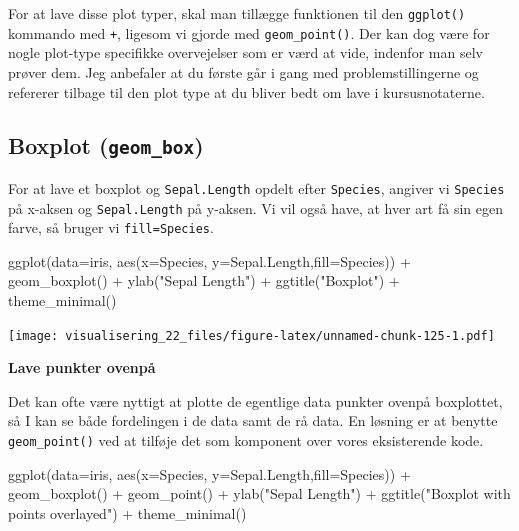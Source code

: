 \documentclass[
]{book}
\newenvironment{Shaded}{\begin{snugshade}}{\end{snugshade}}
\newcommand{\AttributeTok}[1]{\textcolor[rgb]{0.77,0.63,0.00}{#1}}
\newcommand{\FunctionTok}[1]{\textcolor[rgb]{0.00,0.00,0.00}{#1}}
\newcommand{\NormalTok}[1]{#1}
\newcommand{\SpecialCharTok}[1]{\textcolor[rgb]{0.00,0.00,0.00}{#1}}
\newcommand{\StringTok}[1]{\textcolor[rgb]{0.31,0.60,0.02}{#1}}
\begin{document}
For at lave disse plot typer, skal man tillægge funktionen til den \texttt{ggplot()} kommando med \texttt{+}, ligesom vi gjorde med \texttt{geom\_point()}. Der kan dog være for nogle plot-type specifikke overvejelser som er værd at vide, indenfor man selv prøver dem. Jeg anbefaler at du første går i gang med problemstillingerne og refererer tilbage til den plot type at du bliver bedt om lave i kursusnotaterne.

\hypertarget{boxplot-geom_box}{%
\subsection{\texorpdfstring{Boxplot (\texttt{geom\_box})}{Boxplot (geom\_box)}}\label{boxplot-geom_box}}

For at lave et boxplot og \texttt{Sepal.Length} opdelt efter \texttt{Species}, angiver vi \texttt{Species} på x-aksen og \texttt{Sepal.Length} på y-aksen. Vi vil også have, at hver art få sin egen farve, så bruger vi \texttt{fill=Species}.

\begin{Shaded}
\begin{Highlighting}[]
\FunctionTok{ggplot}\NormalTok{(}\AttributeTok{data=}\NormalTok{iris, }\FunctionTok{aes}\NormalTok{(}\AttributeTok{x=}\NormalTok{Species, }\AttributeTok{y=}\NormalTok{Sepal.Length,}\AttributeTok{fill=}\NormalTok{Species)) }\SpecialCharTok{+} 
  \FunctionTok{geom\_boxplot}\NormalTok{() }\SpecialCharTok{+} 
  \FunctionTok{ylab}\NormalTok{(}\StringTok{"Sepal Length"}\NormalTok{) }\SpecialCharTok{+} 
  \FunctionTok{ggtitle}\NormalTok{(}\StringTok{"Boxplot"}\NormalTok{) }\SpecialCharTok{+}
  \FunctionTok{theme\_minimal}\NormalTok{()}
\end{Highlighting}
\end{Shaded}

\texttt{[image: visualisering\_22\_files/figure-latex/unnamed-chunk-125-1.pdf]}

\textbf{Lave punkter ovenpå}

Det kan ofte være nyttigt at plotte de egentlige data punkter ovenpå boxplottet, så I kan se både fordelingen i de data samt de rå data. En løsning er at benytte \texttt{geom\_point()} ved at tilføje det som komponent over vores eksisterende kode.

\begin{Shaded}
\begin{Highlighting}[]
\FunctionTok{ggplot}\NormalTok{(}\AttributeTok{data=}\NormalTok{iris, }\FunctionTok{aes}\NormalTok{(}\AttributeTok{x=}\NormalTok{Species, }\AttributeTok{y=}\NormalTok{Sepal.Length,}\AttributeTok{fill=}\NormalTok{Species)) }\SpecialCharTok{+} 
  \FunctionTok{geom\_boxplot}\NormalTok{() }\SpecialCharTok{+} 
  \FunctionTok{geom\_point}\NormalTok{() }\SpecialCharTok{+} 
  \FunctionTok{ylab}\NormalTok{(}\StringTok{"Sepal Length"}\NormalTok{) }\SpecialCharTok{+} 
  \FunctionTok{ggtitle}\NormalTok{(}\StringTok{"Boxplot with points overlayed"}\NormalTok{) }\SpecialCharTok{+} 
  \FunctionTok{theme\_minimal}\NormalTok{()}
\end{Highlighting}
\end{Shaded}
\end{document}
